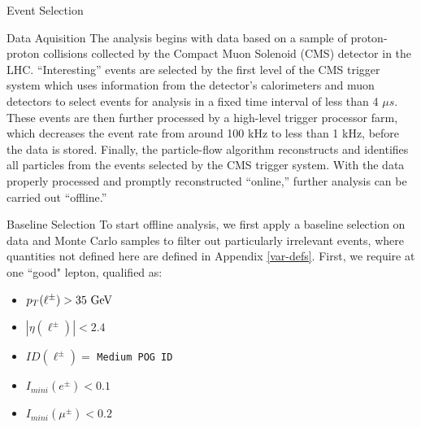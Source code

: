 \begin{section}{Event Selection}
\begin{subsection}{Data Aquisition}\label{data-aquisition}
The analysis begins with data based on a sample of proton-proton collisions collected by the Compact Muon Solenoid (CMS) detector in the LHC. ``Interesting'' events are selected by the first level of the CMS trigger system which uses information from the detector's calorimeters and muon detectors to select events for analysis in a fixed time interval of less than 4 $\mu s$. These events are then further processed by a high-level trigger processor farm, which decreases the event rate from around 100 kHz to less than 1 kHz, before the data is stored. Finally, the particle-flow algorithm reconstructs and identifies all particles from the events selected by the CMS trigger system. With the data properly processed and promptly reconstructed ``online,'' further analysis can be carried out ``offline.''
\end{subsection}
\begin{subsection}{Baseline Selection}\label{baseline-selection}
To start offline analysis, we first apply a baseline selection on data and Monte Carlo samples to filter out particularly irrelevant events, where quantities not defined here are defined in Appendix \ref{var-defs}. First, we require at one ``good" lepton, qualified as:
\begin{itemize}
    \item $p_{T}(\ell^{\pm}) > 35\textnormal{ GeV}$
    \item $|\eta(\ell^{\pm})| < 2.4$
    \item $ID(\ell^{\pm}) =$ \verb|Medium POG ID|
    \item $I_{mini}(e^{\pm}) < 0.1$
    \item $I_{mini}(\mu^{\pm}) < 0.2$
\end{itemize}


\end{subsection}
\end{section}
